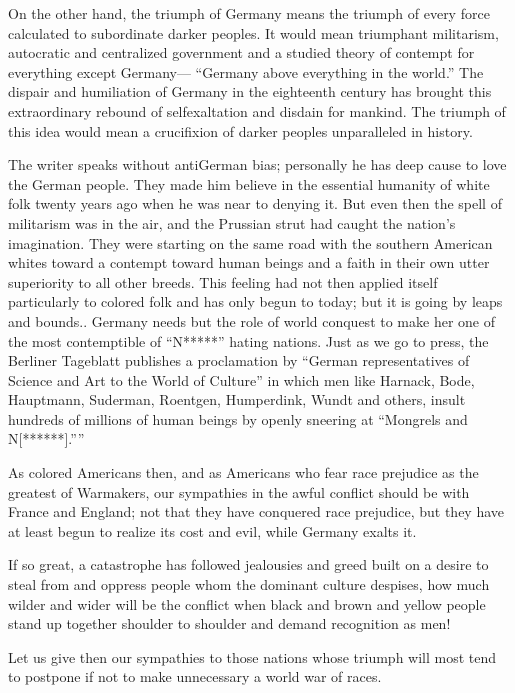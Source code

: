 \documentclass[letterpaper,10pt,english]{jupyterBook}
\begin{document}
\sphinxAtStartPar
On the other hand, the triumph of Germany means the triumph of every force calculated to subordinate darker peoples. It would mean triumphant militarism, autocratic and centralized government and a studied theory of contempt for everything except Germany— “Germany above everything in the world.” The dispair and humiliation of Germany in the eighteenth century has brought this extraordinary rebound of self\sphinxhyphen{}exaltation and disdain for mankind. The triumph of this idea would mean a crucifixion of darker peoples unparalleled in history.

\sphinxAtStartPar
The writer speaks without anti\sphinxhyphen{}German bias; personally he has deep cause to love the German people. They made him believe in the essential humanity of white folk twenty years ago when he was near to denying it. But even then the spell of militarism was in the air, and the Prussian strut had caught the nation’s imagination. They were starting on the same road with the southern American whites toward a contempt toward human beings and a faith in their own utter superiority to all other breeds. This feeling had not then applied itself particularly to colored folk and has only begun to to\sphinxhyphen{}day; but it is going by leaps and bounds.. Germany needs but the role of world conquest to make her one of the most contemptible of “N*****” hating nations. Just as we go to press, the Berliner Tageblatt publishes a proclamation by “German representatives of Science and Art to the World of Culture” in which men like Harnack, Bode, Hauptmann, Suderman, Roentgen, Humperdink, Wundt and others, insult hundreds of millions of human beings by openly sneering at “Mongrels and N{[}******{]}.””

\sphinxAtStartPar
As colored Americans then, and as Americans who fear race prejudice as the greatest of War\sphinxhyphen{}makers, our sympathies in the awful conflict should be with France and England; not that they have conquered race prejudice, but they have at least begun to realize its cost and evil, while Germany exalts it.

\sphinxAtStartPar
If so great, a catastrophe has followed jealousies and greed built on a desire to steal from and oppress people whom the dominant culture despises, how much wilder and wider will be the conflict when black and brown and yellow people stand up together shoulder to shoulder and demand recognition as men!

\sphinxAtStartPar
Let us give then our sympathies to those nations whose triumph will most tend to postpone if not to make unnecessary a world war of races.
\end{document}
